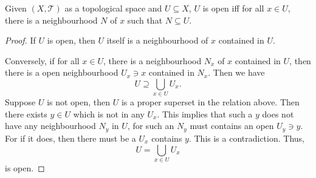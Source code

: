 \begin{proposition}
	\label{prop: alt-def of open sets by neighbourhoods}
	Given $(X, \mathcal T)$ as a topological space and $U \subseteq X$, $U$ is open iff for all $x \in U$, there is a neighbourhood $N$ of $x$ such that $N \subseteq U$.
	
	\begin{proof}
		If $U$ is open, then $U$ itself is a neighbourhood of $x$ contained in $U$.
		
		Conversely, if for all $x \in U$, there is a neighbourhood $N_x$ of $x$ contained in $U$, then there is a open neighbourhood $U_x \ni x$ contained in $N_x$. Then we have
		$$
		U \supseteq \bigcup_{x \in U} U_x.
		$$
		Suppose $U$ is not open, then $U$ is a proper superset in the relation above. Then there exists $y \in U$ which is not in any $U_x$. This implies that such a $y$ does not have any neighbourhood $N_y$ in $U$, for such an $N_y$ must contains an open $U_y \ni y$. For if it does, then there must be a $U_x$ contains $y$. This is a contradiction. Thus,
		$$
		U = \bigcup_{x \in U} U_x
		$$
		is open.
	\end{proof}
\end{proposition}
